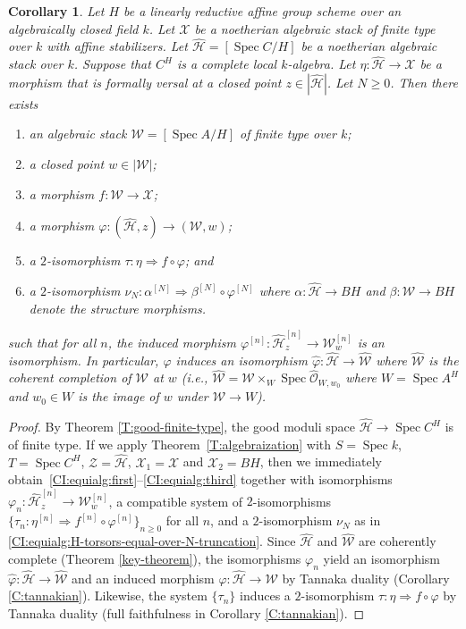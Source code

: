 \documentclass[a4paper]{amsart}
\theoremstyle{plain}
\newtheorem{corollary}[theorem]{Corollary}
\theoremstyle{definition}
\theoremstyle{remark}
\numberwithin{equation}{section}
\newcommand\cH{\mathcal{H}}
\newcommand\cW{\mathcal{W}}
\newcommand\cX{\mathcal{X}}
\newcommand\cZ{\mathcal{Z}}
\newcommand\oh{\mathcal{O}}
\newcommand\co{\colon}
\DeclareMathOperator{\Spec}{Spec}
\renewcommand{\hat}{\widehat}
\newcommand{\itemref}[1]{\eqref{#1}}
\begin{document}
\begin{corollary}\label{C:equivariant-algebraization}
Let $H$ be a linearly reductive affine group scheme over an algebraically closed field $k$.
Let $\cX$ be a noetherian algebraic stack of
finite type over $k$ with affine stabilizers.
Let $\hat{\cH} = [\Spec C / H]$ be a noetherian algebraic stack over $k$. Suppose that $C^{H}$ is a complete local $k$-algebra.
 Let $\eta\colon \hat{\cH} \to \cX$ be a morphism
that is formally versal at a closed point $z\in |\hat{\cH} |$.  Let $N \ge 0$. Then there exists 
\begin{enumerate}
\item\label{CI:equialg:first}
  an algebraic stack $\cW = [\Spec A / H]$ of finite type over $k$;
\item a closed point $w \in |\cW|$;
\item\label{CI:equialg:third}
  a morphism
$f \co \cW \to \cX$;
\item
  a morphism
$\varphi \co (\hat{\cH},z) \to (\cW,w)$;
\item a $2$-isomorphism $\tau\co \eta\Rightarrow f\circ \varphi$; and
\item\label{CI:equialg:H-torsors-equal-over-N-truncation}
  a $2$-isomorphism $\nu_N\co \alpha^{[N]}\Rightarrow \beta^{[N]}\circ
  \varphi^{[N]}$ where $\alpha\co \hat{\cH}\to BH$ and $\beta\co \cW\to BH$
  denote the structure morphisms.
\end{enumerate}
such that for all $n$, the induced morphism $\varphi^{[n]} \co \hat{\cH}^{[n]}_z \to \cW^{[n]}_w$ is an isomorphism.
In particular, $\varphi$ induces an isomorphism $\hat{\varphi} \co  \hat{\cH} \to \hat{\cW}$ where $\hat{\cW}$ is the coherent completion of $\cW$ at $w$ (i.e., $\hat{\cW}= \cW \times_{W} \Spec \hat{\oh}_{W,w_0}$ where $W = \Spec A^H$ and $w_0 \in W$ is the image of $w $ under $\cW \to W$).
\end{corollary}
\begin{proof}
By Theorem \ref{T:good-finite-type}, the good moduli space
$\hat{\cH}\to \Spec C^H$ is of finite type.
If we apply Theorem~\ref{T:algebraization} with $S = \Spec k$, $T=\Spec C^H$,
$\cZ=\hat{\cH}$,
$\cX_1 = \cX$
and $\cX_2 = BH$, then we immediately
obtain~\itemref{CI:equialg:first}--\itemref{CI:equialg:third} together with
isomorphisms $\varphi_n \co \hat{\cH}_z^{[n]}\to \cW_w^{[n]}$, a compatible
system of $2$-isomorphisms $\{\tau_n \co \eta^{[n]}\Rightarrow f^{[n]}\circ
\varphi^{[n]}\}_{n\geq 0}$ for all $n$, and a $2$-isomorphism $\nu_N$ as in
\itemref{CI:equialg:H-torsors-equal-over-N-truncation}. Since $\hat{\cH}$ and
$\hat{\cW}$ are coherently complete (Theorem \ref{key-theorem}), the
isomorphisms $\varphi_n$ yield an isomorphism
$\hat{\varphi} \co \hat{\cH}\to \hat{\cW}$ and an induced morphism
$\varphi \co \hat{\cH}\to \cW$ by 
Tannaka duality (Corollary \ref{C:tannakian}).
Likewise, the system $\{\tau_n\}$ induces a $2$-isomorphism $\tau\co \eta
\Rightarrow f\circ \varphi$ by Tannaka duality (full faithfulness in
Corollary \ref{C:tannakian}).
\end{proof}
\end{document}
